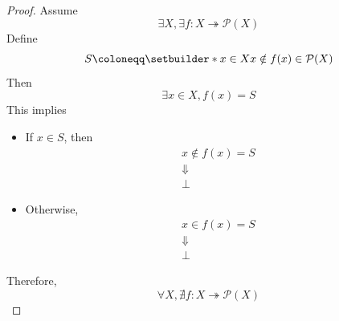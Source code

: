 \begin{proof}
  Assume
  \[
    \exists X, \exists f: X \twoheadrightarrow \mathcal{P}(X)
  \]
  Define
  \[
    S \coloneqq \setbuilder*{x \in X}{x \notin f(x)} \in \mathcal{P}(X)
  \]
  Then
  \[
    \exists x \in X, f(x) = S
  \]
  This implies
  \begin{itemize}
    \item If $x \in S$, then
          \[
            \begin{array}{c}
              x \notin f(x) = S \\
              \Downarrow        \\
              \bot
            \end{array}
          \]
    \item Otherwise,
          \[
            \begin{array}{c}
              x \in f(x) = S \\
              \Downarrow     \\
              \bot
            \end{array}
          \]
  \end{itemize}
  Therefore,
  \[
    \forall X, \nexists f: X \twoheadrightarrow \mathcal{P}(X)
  \]
\end{proof}

